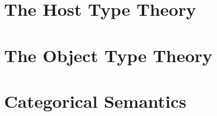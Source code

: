 \documentclass[a4paper,UKenglish,cleveref, autoref,numberwithinsect]{lipics-v2019}
\begin{document}
\section{The Host Type Theory}
\label{sec:prelim}



\section{The Object Type Theory}
\label{sec:syntax}



\section{Categorical Semantics}
\end{document}

